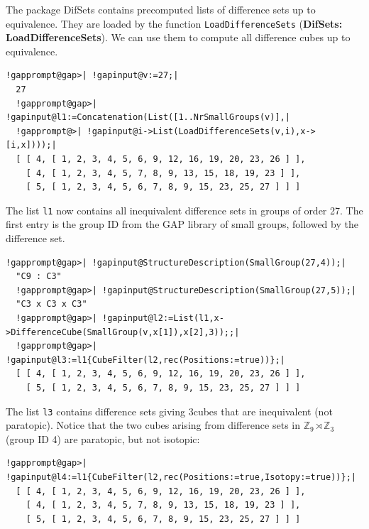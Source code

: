 \documentclass[a4paper,11pt]{report}
\begin{document}
{{ The package \textsf{DifSets} contains precomputed lists of difference sets up to equivalence. They are
loaded by the function \texttt{LoadDifferenceSets} (\textbf{DifSets: LoadDifferenceSets}). We can use them to compute all difference cubes up to equivalence. 
\begin{Verbatim}[commandchars=!@|,fontsize=\small,frame=single,label=Example]
  !gapprompt@gap>| !gapinput@v:=27;|
  27
  !gapprompt@gap>| !gapinput@l1:=Concatenation(List([1..NrSmallGroups(v)],|
  !gapprompt@>| !gapinput@i->List(LoadDifferenceSets(v,i),x->[i,x])));|
  [ [ 4, [ 1, 2, 3, 4, 5, 6, 9, 12, 16, 19, 20, 23, 26 ] ], 
    [ 4, [ 1, 2, 3, 4, 5, 7, 8, 9, 13, 15, 18, 19, 23 ] ], 
    [ 5, [ 1, 2, 3, 4, 5, 6, 7, 8, 9, 15, 23, 25, 27 ] ] ]
\end{Verbatim}
 The list \texttt{l1} now contains all inequivalent difference sets in groups of order 27. The first
entry is the group ID from the \textsf{GAP} library of small groups, followed by the difference set. 
\begin{Verbatim}[commandchars=!@|,fontsize=\small,frame=single,label=Example]
  !gapprompt@gap>| !gapinput@StructureDescription(SmallGroup(27,4));|
  "C9 : C3"
  !gapprompt@gap>| !gapinput@StructureDescription(SmallGroup(27,5));|
  "C3 x C3 x C3"
  !gapprompt@gap>| !gapinput@l2:=List(l1,x->DifferenceCube(SmallGroup(v,x[1]),x[2],3));;|
  !gapprompt@gap>| !gapinput@l3:=l1{CubeFilter(l2,rec(Positions:=true))};|
  [ [ 4, [ 1, 2, 3, 4, 5, 6, 9, 12, 16, 19, 20, 23, 26 ] ], 
    [ 5, [ 1, 2, 3, 4, 5, 6, 7, 8, 9, 15, 23, 25, 27 ] ] ]
\end{Verbatim}
 The list \texttt{l3} contains difference sets giving 3\texttt{}cubes that are
inequivalent (not paratopic). Notice that the two cubes arising from
difference sets in ${\ensuremath{\mathbb Z}}_9\rtimes {\ensuremath{\mathbb Z}}_3$ (group ID 4) are paratopic, but not isotopic: 
\begin{Verbatim}[commandchars=!@|,fontsize=\small,frame=single,label=Example]
  !gapprompt@gap>| !gapinput@l4:=l1{CubeFilter(l2,rec(Positions:=true,Isotopy:=true))};|
  [ [ 4, [ 1, 2, 3, 4, 5, 6, 9, 12, 16, 19, 20, 23, 26 ] ], 
    [ 4, [ 1, 2, 3, 4, 5, 7, 8, 9, 13, 15, 18, 19, 23 ] ], 
    [ 5, [ 1, 2, 3, 4, 5, 6, 7, 8, 9, 15, 23, 25, 27 ] ] ]
\end{Verbatim}
 

}}
\end{document}
